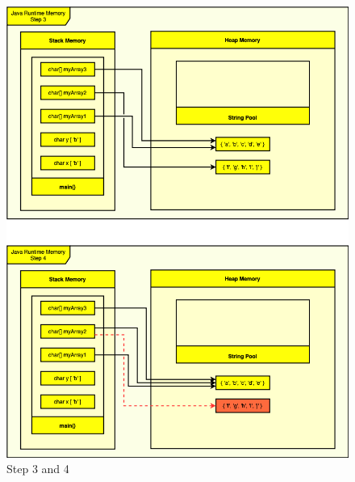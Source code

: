 \documentclass{assignment}
\begin{document}
\begin{figure}[p]
    \centering
    \includegraphics[scale=0.6]{assets/homework2Diagram(3-4).png}
    \caption{Step 3 and 4}
\end{figure}
\end{document}
